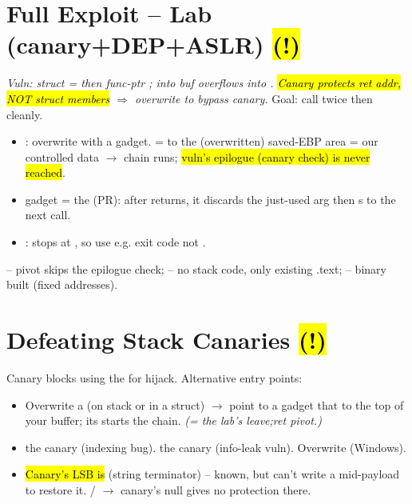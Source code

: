 \section{Full Exploit -- Lab (canary+DEP+ASLR) \hl{(!)}}
\textit{Vuln: struct  =  then func-ptr ;  into buf overflows into . \hl{Canary protects ret addr, NOT struct members} $\Rightarrow$ overwrite  to bypass canary.} Goal: call  twice then  cleanly.
\begin{itemize}
\item {}: overwrite  with a  gadget. =  to the (overwritten) saved-EBP area = our controlled data $\to$ chain runs; \hl{vuln's epilogue (canary check) is never reached}.
\item {} gadget = the  (PR): after  returns, it discards the just-used arg then s to the next call.
\item {}:  stops at , so use e.g. exit code  not .
\end{itemize}
  -- pivot skips the epilogue check;  -- no stack code, only existing .text;  -- binary built  (fixed addresses).

\section{Defeating Stack Canaries \hl{(!)}}
Canary blocks using the  for hijack. Alternative entry points:
\begin{itemize}
\item Overwrite a  (on stack or in a struct) $\to$ point to a gadget that  to the top of your buffer; its  starts the chain. \textit{(= the lab's leave;ret pivot.)}
\item {} the canary (indexing bug).  the canary (info-leak vuln). Overwrite  (Windows).
\item \hl{Canary's LSB is } (string terminator) -- known, but  can't write a mid-payload  to restore it. /  $\to$ canary's null gives no protection there.
\end{itemize}

